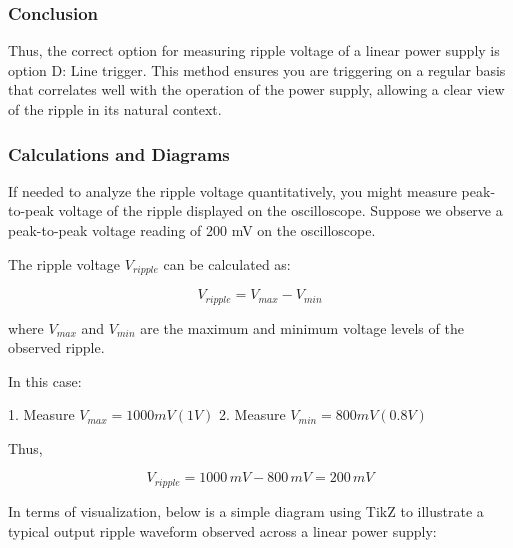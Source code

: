 \subsubsection{Conclusion}

Thus, the correct option for measuring ripple voltage of a linear power supply is option D: Line trigger. This method ensures you are triggering on a regular basis that correlates well with the operation of the power supply, allowing a clear view of the ripple in its natural context.

\subsubsection{Calculations and Diagrams}

If needed to analyze the ripple voltage quantitatively, you might measure peak-to-peak voltage of the ripple displayed on the oscilloscope. Suppose we observe a peak-to-peak voltage reading of 200 mV on the oscilloscope. 

The ripple voltage \( V_{ripple} \) can be calculated as:

\[
V_{ripple} = V_{max} - V_{min}
\]

where \( V_{max} \) and \( V_{min} \) are the maximum and minimum voltage levels of the observed ripple.

In this case:

1. Measure \( V_{max} = 1000 mV (1V) \)
2. Measure \( V_{min} = 800 mV (0.8V) \)

Thus, 

\[
V_{ripple} = 1000 \, mV - 800 \, mV = 200 \, mV
\]

In terms of visualization, below is a simple diagram using TikZ to illustrate a typical output ripple waveform observed across a linear power supply:

